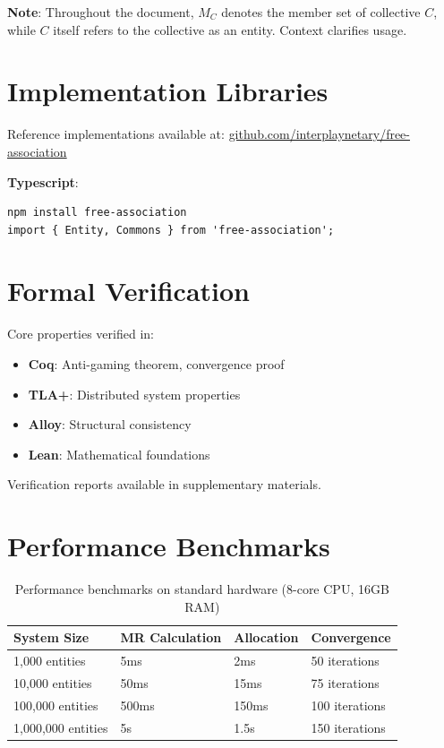 \documentclass[11pt,a4paper]{article}
\theoremstyle{definition}
\theoremstyle{remark}
\begin{document}
\textbf{Note}: Throughout the document, $M_C$ denotes the member set of collective $C$, while $C$ itself refers to the collective as an entity. Context clarifies usage.

\section{Implementation Libraries}

Reference implementations available at: \url{github.com/interplaynetary/free-association}

\textbf{Typescript}:
\begin{verbatim}
npm install free-association
import { Entity, Commons } from 'free-association';
\end{verbatim}

\section{Formal Verification}

Core properties verified in:
\begin{itemize}
\item \textbf{Coq}: Anti-gaming theorem, convergence proof
\item \textbf{TLA+}: Distributed system properties
\item \textbf{Alloy}: Structural consistency
\item \textbf{Lean}: Mathematical foundations
\end{itemize}

Verification reports available in supplementary materials.

\section{Performance Benchmarks}

\begin{table}[h]
\centering
\begin{tabular}{llll}
\toprule
\textbf{System Size} & \textbf{MR Calculation} & \textbf{Allocation} & \textbf{Convergence} \\
\midrule
1,000 entities & 5ms & 2ms & 50 iterations \\
10,000 entities & 50ms & 15ms & 75 iterations \\
100,000 entities & 500ms & 150ms & 100 iterations \\
1,000,000 entities & 5s & 1.5s & 150 iterations \\
\bottomrule
\end{tabular}
\caption{Performance benchmarks on standard hardware (8-core CPU, 16GB RAM)}
\end{table}
\end{document}
